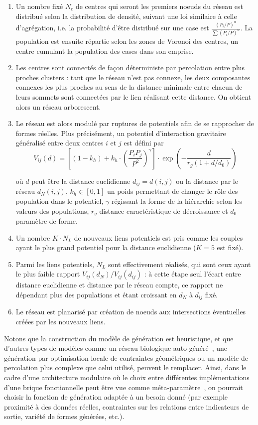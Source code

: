 \begin{enumerate}
\item Un nombre fixé $N_c$ de centres qui seront les premiers noeuds du réseau est distribué selon la distribution de densité, suivant une loi similaire à celle d'agrégation, i.e. la probabilité d'être distribué sur une case est $\frac{(P_i/P)^{\alpha}}{\sum (P_i/P)^{\alpha}}$. La population est ensuite répartie selon les zones de Voronoi des centres, un centre cumulant la population des cases dans son emprise.
\item Les centres sont connectés de façon déterministe par percolation entre plus proches clusters : tant que le réseau n'est pas connexe, les deux composantes connexes les plus proches au sens de la distance minimale entre chacun de leurs sommets sont connectées par le lien réalisant cette distance. On obtient alors un réseau arborescent.
\item Le réseau est alors modulé par ruptures de potentiels afin de se rapprocher de formes réelles. Plus précisément, un potentiel d'interaction gravitaire généralisé entre deux centres $i$ et $j$ est défini par
\[
V_{ij}(d) = \left[ (1 - k_h) + k_h \cdot \left( \frac{P_i P_j}{P^2} \right)^{\gamma} \right]\cdot \exp{\left( -\frac{d}{r_g (1 + d/d_0)} \right)}
\]

où $d$ peut être la distance euclidienne $d_{ij}=d(i,j)$ ou la distance par le réseau $d_N(i,j)$, $k_h \in [0,1]$ un poids permettant de changer le rôle des population dans le potentiel, $\gamma$ régissant la forme de la hiérarchie selon les valeurs des populations, $r_g$ distance caractéristique de décroissance et $d_0$ paramètre de forme.
\item Un nombre $K\cdot N_L$ de nouveaux liens potentiels est pris comme les couples ayant le plus grand potentiel pour la distance euclidienne ($K=5$ est fixé).
\item Parmi les liens potentiels, $N_L$ sont effectivement réalisés, qui sont ceux ayant le plus faible rapport $V_{ij}(d_N)/V_{ij}(d_{ij})$ : à cette étape seul l'écart entre distance euclidienne et distance par le réseau compte, ce rapport ne dépendant plus des populations et étant croissant en $d_N$ à $d_{ij}$ fixé.
\item Le réseau est planarisé par création de noeuds aux intersections éventuelles créées par les nouveaux liens.
\end{enumerate}


Notons que la construction du modèle de génération est heuristique, et que d'autres types de modèles comme un réseau biologique auto-généré~\cite{TeroAl10}, une génération par optimisation locale de contraintes géométriques \cite{barthelemy2008modeling} ou un modèle de percolation plus complexe que celui utilisé, peuvent le remplacer. Ainsi, dans le cadre d'une architecture modulaire où le choix entre différentes implémentations d'une brique fonctionnelle peut être vue comme méta-paramètre~\cite{cottineau2015incremental}, on pourrait choisir la fonction de génération adaptée à un besoin donné (par exemple proximité à des données réelles, contraintes sur les relations entre indicateurs de sortie, variété de formes générées, etc.).


